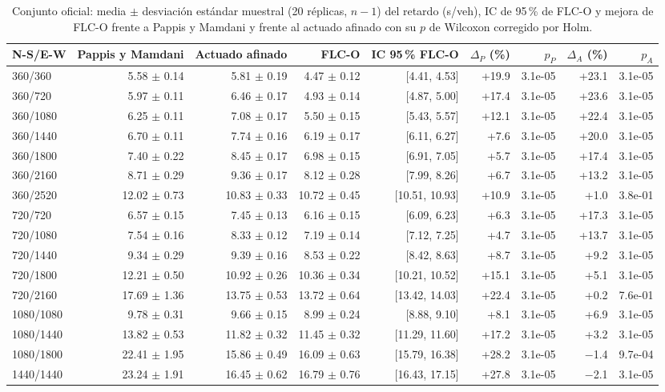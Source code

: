 \begin{table}[!t]
\centering
\caption{Conjunto oficial: media $\pm$ desviaci\'on est\'andar muestral (20 r\'eplicas, $n-1$) del retardo (s/veh), IC de 95\,\% de FLC-O y mejora de FLC-O frente a Pappis y Mamdani y frente al actuado afinado con su $p$ de Wilcoxon corregido por Holm.}
\label{tab:spares}
\scriptsize
\begin{tabular}{@{}lrrrrrrrr@{}}
\toprule
N-S/E-W & Pappis y Mamdani & Actuado afinado & FLC-O & IC 95\,\% FLC-O & $\Delta_P$ (\%) & $p_P$ & $\Delta_A$ (\%) & $p_A$ \\
\midrule
360/360 & 5.58 $\pm$ 0.14 & 5.81 $\pm$ 0.19 & 4.47 $\pm$ 0.12 & [4.41, 4.53] & +19.9 & 3.1e-05 & +23.1 & 3.1e-05 \\
360/720 & 5.97 $\pm$ 0.11 & 6.46 $\pm$ 0.17 & 4.93 $\pm$ 0.14 & [4.87, 5.00] & +17.4 & 3.1e-05 & +23.6 & 3.1e-05 \\
360/1080 & 6.25 $\pm$ 0.11 & 7.08 $\pm$ 0.17 & 5.50 $\pm$ 0.15 & [5.43, 5.57] & +12.1 & 3.1e-05 & +22.4 & 3.1e-05 \\
360/1440 & 6.70 $\pm$ 0.11 & 7.74 $\pm$ 0.16 & 6.19 $\pm$ 0.17 & [6.11, 6.27] & +7.6 & 3.1e-05 & +20.0 & 3.1e-05 \\
360/1800 & 7.40 $\pm$ 0.22 & 8.45 $\pm$ 0.17 & 6.98 $\pm$ 0.15 & [6.91, 7.05] & +5.7 & 3.1e-05 & +17.4 & 3.1e-05 \\
360/2160 & 8.71 $\pm$ 0.29 & 9.36 $\pm$ 0.17 & 8.12 $\pm$ 0.28 & [7.99, 8.26] & +6.7 & 3.1e-05 & +13.2 & 3.1e-05 \\
360/2520 & 12.02 $\pm$ 0.73 & 10.83 $\pm$ 0.33 & 10.72 $\pm$ 0.45 & [10.51, 10.93] & +10.9 & 3.1e-05 & +1.0 & 3.8e-01 \\
720/720 & 6.57 $\pm$ 0.15 & 7.45 $\pm$ 0.13 & 6.16 $\pm$ 0.15 & [6.09, 6.23] & +6.3 & 3.1e-05 & +17.3 & 3.1e-05 \\
720/1080 & 7.54 $\pm$ 0.16 & 8.33 $\pm$ 0.12 & 7.19 $\pm$ 0.14 & [7.12, 7.25] & +4.7 & 3.1e-05 & +13.7 & 3.1e-05 \\
720/1440 & 9.34 $\pm$ 0.29 & 9.39 $\pm$ 0.16 & 8.53 $\pm$ 0.22 & [8.42, 8.63] & +8.7 & 3.1e-05 & +9.2 & 3.1e-05 \\
720/1800 & 12.21 $\pm$ 0.50 & 10.92 $\pm$ 0.26 & 10.36 $\pm$ 0.34 & [10.21, 10.52] & +15.1 & 3.1e-05 & +5.1 & 3.1e-05 \\
720/2160 & 17.69 $\pm$ 1.36 & 13.75 $\pm$ 0.53 & 13.72 $\pm$ 0.64 & [13.42, 14.03] & +22.4 & 3.1e-05 & +0.2 & 7.6e-01 \\
1080/1080 & 9.78 $\pm$ 0.31 & 9.66 $\pm$ 0.15 & 8.99 $\pm$ 0.24 & [8.88, 9.10] & +8.1 & 3.1e-05 & +6.9 & 3.1e-05 \\
1080/1440 & 13.82 $\pm$ 0.53 & 11.82 $\pm$ 0.32 & 11.45 $\pm$ 0.32 & [11.29, 11.60] & +17.2 & 3.1e-05 & +3.2 & 3.1e-05 \\
1080/1800 & 22.41 $\pm$ 1.95 & 15.86 $\pm$ 0.49 & 16.09 $\pm$ 0.63 & [15.79, 16.38] & +28.2 & 3.1e-05 & $-$1.4 & 9.7e-04 \\
1440/1440 & 23.24 $\pm$ 1.91 & 16.45 $\pm$ 0.62 & 16.79 $\pm$ 0.76 & [16.43, 17.15] & +27.8 & 3.1e-05 & $-$2.1 & 3.1e-05 \\
\bottomrule
\end{tabular}
\end{table}

